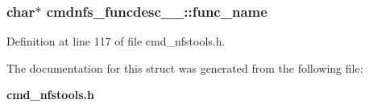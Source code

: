 \subsubsection[{func\_\-name}]{\setlength{\rightskip}{0pt plus 5cm}char$\ast$ {\bf cmdnfs\_\-funcdesc\_\-\_\-::func\_\-name}}\label{structcmdnfs__funcdesc_____743ef8af39998db9ac6567f7525ac3f2}




Definition at line 117 of file cmd\_\-nfstools.h.

The documentation for this struct was generated from the following file:\begin{CompactItemize}
\item 
{\bf cmd\_\-nfstools.h}\end{CompactItemize}
